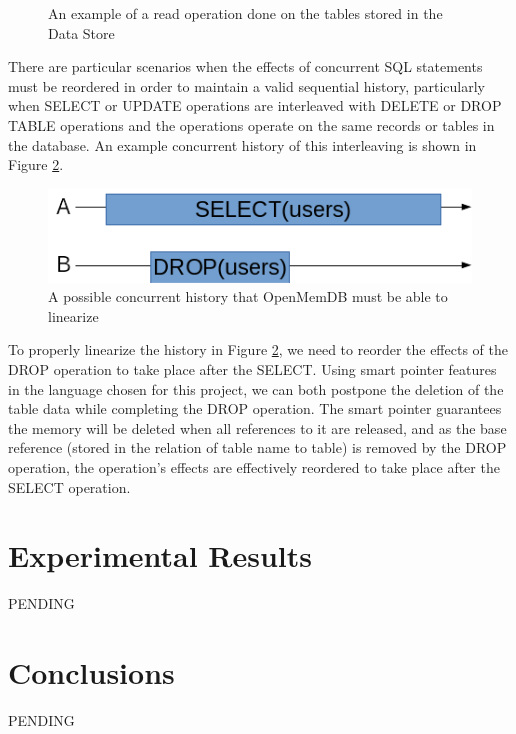 \documentclass[letter,11pt]{article}
\let\oldReturn\Return
\renewcommand{\Return}{\State\oldReturn}
\begin{document}
\begin{figure}[h]
 \begin{algorithmic}
  \EndFor
 \Else
 \EndIf
 \EndFunction
 \end{algorithmic}
 \caption{An example of a read operation done on the tables stored in the Data Store}
 \label{read_op}
\end{figure}

\par\vspace{\baselineskip}
There are particular scenarios when the effects of concurrent SQL statements must be reordered
in order to maintain a valid sequential history, particularly when SELECT or UPDATE operations
are interleaved with DELETE or DROP TABLE operations and the operations operate on the same 
records or tables in the database. An example concurrent history of this interleaving is shown in 
Figure \ref{concurrent_history}.

\begin{figure}[h]
\centering
  \includegraphics[scale=.75]{concurrent_history_1}
  \caption{A possible concurrent history that OpenMemDB must be able to linearize}
  \label{concurrent_history}
\end{figure}

\par\vspace{\baselineskip}
To properly linearize the history in Figure \ref{concurrent_history}, we need to reorder 
the effects of the DROP operation to take place after the SELECT. Using smart pointer features 
in the language chosen for this project, we can both postpone the deletion of the 
table data while completing the DROP operation. The smart pointer guarantees the memory will 
be deleted when all references to it are released, and as the base reference (stored in the 
relation of table name to table) is removed by the DROP operation, the operation's effects 
are effectively reordered to take place after the SELECT operation.

\section{Experimental Results}
PENDING

\section{Conclusions}
PENDING

\newpage


\newpage
\end{document}
